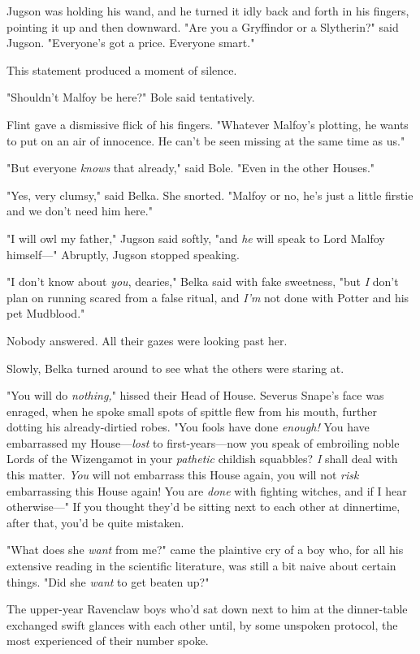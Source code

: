 Jugson was holding his wand, and he turned it idly back and forth in his
fingers, pointing it up and then downward. "Are you a Gryffindor or a
Slytherin?" said Jugson. "Everyone's got a price. Everyone smart."

This statement produced a moment of silence.

"Shouldn't Malfoy be here?" Bole said tentatively.

Flint gave a dismissive flick of his fingers. "Whatever Malfoy's plotting, he
wants to put on an air of innocence. He can't be seen missing at the same time
as us."

"But everyone \emph{knows} that already," said Bole. "Even in the other Houses."

"Yes, very clumsy," said Belka. She snorted. "Malfoy or no, he's just a little
firstie and we don't need him here."

"I will owl my father," Jugson said softly, "and \emph{he} will speak to Lord
Malfoy himself\mbox{---}" Abruptly, Jugson stopped speaking.

"I don't know about \emph{you}, dearies," Belka said with fake sweetness, "but
\emph{I} don't plan on running scared from a false ritual, and \emph{I'm} not
done with Potter and his pet Mudblood."

Nobody answered. All their gazes were looking past her.

Slowly, Belka turned around to see what the others were staring at.

"You will do \emph{nothing,}" hissed their Head of House. Severus Snape's face
was enraged, when he spoke small spots of spittle flew from his mouth, further
dotting his already-dirtied robes. "You fools have done \emph{enough!} You have
embarrassed my House---\emph{lost} to first-years---now you speak of embroiling
noble Lords of the Wizengamot in your \emph{pathetic} childish squabbles?
\emph{I} shall deal with this matter. \emph{You} will not embarrass this House
again, you will not \emph{risk} embarrassing this House again! You are
\emph{done} with fighting witches, and if I hear otherwise\mbox{---}"
\sbreak
If you thought they'd be sitting next to each other at dinnertime, after that,
you'd be quite mistaken.

"What does she \emph{want} from me?" came the plaintive cry of a boy who, for
all his extensive reading in the scientific literature, was still a bit naive
about certain things. "Did she \emph{want} to get beaten up?"

The upper-year Ravenclaw boys who'd sat down next to him at the dinner-table
exchanged swift glances with each other until, by some unspoken protocol, the
most experienced of their number spoke.

